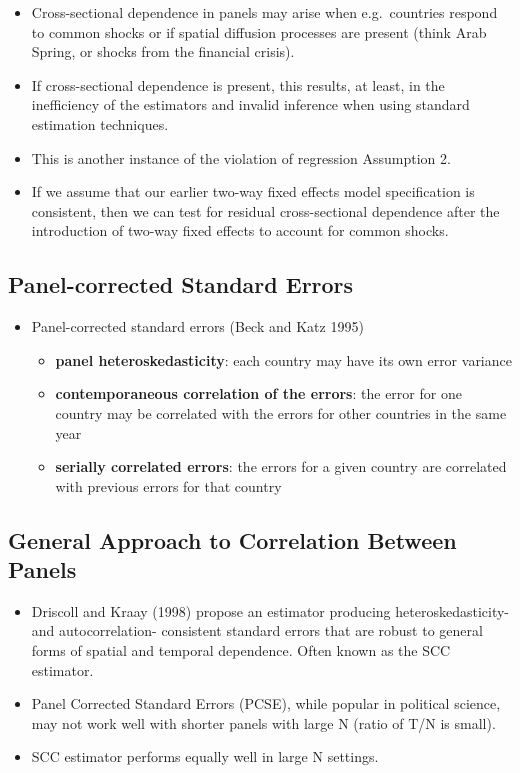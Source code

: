 \documentclass[]{article}
\theoremstyle{definition}
\theoremstyle{definition}
\theoremstyle{remark}
\begin{document}
\begin{itemize}
\item
  Cross-sectional dependence in panels may arise when e.g.~countries
  respond to common shocks or if spatial diffusion processes are present
  (think Arab Spring, or shocks from the financial crisis).
\item
  If cross-sectional dependence is present, this results, at least, in
  the inefficiency of the estimators and invalid inference when using
  standard estimation techniques.
\item
  This is another instance of the violation of regression Assumption 2.
\item
  If we assume that our earlier two-way fixed effects model
  specification is consistent, then we can test for residual
  cross-sectional dependence after the introduction of two-way fixed
  effects to account for common shocks.
\end{itemize}

\subsection{Panel-corrected Standard
Errors}\label{panel-corrected-standard-errors}

\begin{itemize}
\item
  Panel-corrected standard errors (Beck and Katz 1995)

  \begin{itemize}
  \item
    \textbf{panel heteroskedasticity}: each country may have its own
    error variance
  \item
    \textbf{contemporaneous correlation of the errors}: the error for
    one country may be correlated with the errors for other countries in
    the same year
  \item
    \textbf{serially correlated errors}: the errors for a given country
    are correlated with previous errors for that country
  \end{itemize}
\end{itemize}

\subsection{General Approach to Correlation Between
Panels}\label{general-approach-to-correlation-between-panels}

\begin{itemize}
\item
  Driscoll and Kraay (1998) propose an estimator producing
  heteroskedasticity- and autocorrelation- consistent standard errors
  that are robust to general forms of spatial and temporal dependence.
  Often known as the SCC estimator.
\item
  Panel Corrected Standard Errors (PCSE), while popular in political
  science, may not work well with shorter panels with large N (ratio of
  T/N is small).
\item
  SCC estimator performs equally well in large N settings.
\end{itemize}
\end{document}
